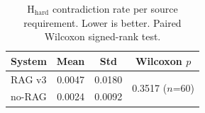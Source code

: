 \begin{table}[H]
\caption{H$_\mathrm{hard}$ contradiction rate per source requirement. Lower is better. Paired Wilcoxon signed-rank test.}
\label{tab:hhard}
\begin{tabular}{lccc}
\toprule
\textbf{System} & \textbf{Mean} & \textbf{Std} & \textbf{Wilcoxon $p$} \\
\midrule
RAG v3  & 0.0047 & 0.0180 & \multirow{2}{*}{0.3517 ($n$=60)} \\
no-RAG  & 0.0024 & 0.0092 & \\
\bottomrule
\end{tabular}
\end{table}